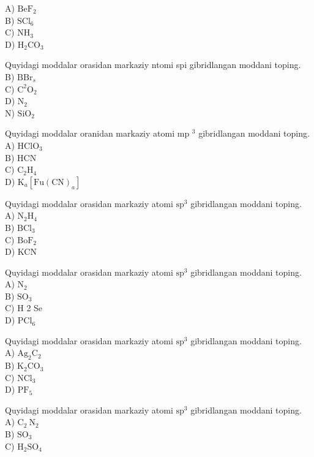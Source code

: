 A) $\mathrm{BeF}_{2}$\\
B) $\mathrm{SCl}_{6}$\\
C) $\mathrm{NH}_{3}$\\
D) $\mathrm{H}_{2} \mathrm{CO}_{3}$
  \item Quyidagi moddalar orasidan markaziy ntomi spi gibridlangan moddani toping.\\
B) $\mathrm{BBr}_{s}$\\
C) $\mathrm{C}^{2} \mathrm{O}_{2}$\\
D) $\mathrm{N}_{2}$\\
N) $\mathrm{SiO}_{2}$
  \item Quyidagi moddalar oranidan markaziy atomi mp ${ }^{3}$ gibridlangan moddani toping.\\
A) $\mathrm{HClO}_{3}$\\
B) HCN\\
C) $\mathrm{C}_{2} \mathrm{H}_{4}$\\
D) $\mathrm{K}_{a}\left[\mathrm{Fu}(\mathrm{CN})_{a}\right]$
  \item Quyidagi moddalar orasidan markaziy atomi $\mathrm{sp}^{3}$ gibridlangan moddani toping.\\
A) $\mathrm{N}_{2} \mathrm{H}_{4}$\\
B) $\mathrm{BCl}_{3}$\\
C) $\mathrm{BoF}_{2}$\\
D) KCN
  \item Quyidagi moddalar orasidan markaziy atomi $\mathrm{sp}^{3}$ gibridlangan moddani toping.\\
A) $\mathrm{N}_{2}$\\
B) $\mathrm{SO}_{3}$\\
C) H 2 Se\\
D) $\mathrm{PCl}_{6}$
  \item Quyidagi moddalar orasidan markaziy atomi $\mathrm{sp}^{3}$ gibridlangan moddani toping.\\
A) $\mathrm{Ag}_{2} \mathrm{C}_{2}$\\
B) $\mathrm{K}_{2} \mathrm{CO}_{3}$\\
C) $\mathrm{NCl}_{3}$\\
D) $\mathrm{PF}_{5}$
  \item Quyidagi moddalar orasidan markaziy atomi $\mathrm{sp}^{3}$ gibridlangan moddani toping.\\
A) $\mathrm{C}_{2} \mathrm{~N}_{2}$\\
B) $\mathrm{SO}_{3}$\\
C) $\mathrm{H}_{2} \mathrm{SO}_{4}$\\
